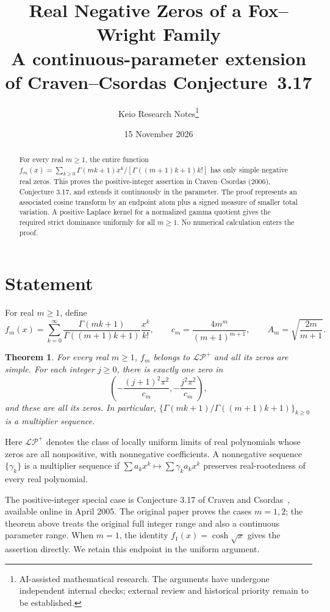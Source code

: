 \documentclass[11pt,a4paper]{article}
\title{\textbf{Real Negative Zeros of a Fox--Wright Family}\\[5pt]\large A continuous-parameter extension of Craven--Csordas Conjecture~3.17}
\author{Keio Research Notes\thanks{AI-assisted mathematical research. The arguments have undergone independent internal checks; external review and historical priority remain to be established.}}
\date{15 November 2026}
\newtheorem{theorem}{Theorem}
\newcommand{\LP}{\mathcal{LP}^{+}}
\begin{document}
\maketitle
\begin{abstract}
For every real $m\ge1$, the entire function
$f_m(x)=\sum_{k\ge0}\Gamma(mk+1)x^k/[\Gamma((m+1)k+1)k!]$
has only simple negative real zeros. This proves the positive-integer assertion
in Craven--Csordas (2006), Conjecture 3.17, and extends it continuously in the
parameter. The proof represents an associated cosine transform by an endpoint
atom plus a signed measure of smaller total variation. A positive Laplace kernel
for a normalized gamma quotient gives the required strict dominance uniformly
for all $m\ge1$. No numerical calculation enters the proof.
\end{abstract}

\section{Statement}
For real $m\ge1$, define
\[
f_m(x)=\sum_{k=0}^{\infty}
\frac{\Gamma(mk+1)}{\Gamma((m+1)k+1)}\frac{x^k}{k!},\qquad
c_m=\frac{4m^m}{(m+1)^{m+1}},\qquad
A_m=\sqrt{\frac{2m}{m+1}}.
\]
\begin{theorem}\label{thm:main}
For every real $m\ge1$, $f_m$ belongs to $\LP$ and all its zeros are simple.
For each integer $j\ge0$, there is exactly one zero in
\[
\left(-\frac{(j+1)^2\pi^2}{c_m},
      -\frac{j^2\pi^2}{c_m}\right),
\]
and these are all its zeros. In particular,
$\{\Gamma(mk+1)/\Gamma((m+1)k+1)\}_{k\ge0}$ is a multiplier sequence.
\end{theorem}
Here $\LP$ denotes the class of locally uniform limits of real
polynomials whose zeros are all nonpositive, with nonnegative coefficients.
A nonnegative sequence $\{\gamma_k\}$ is a multiplier sequence if
$\sum a_kx^k\mapsto\sum\gamma_k a_kx^k$ preserves real-rootedness
of every real polynomial.

The positive-integer special case is Conjecture 3.17 of
Craven and Csordas~\cite{CC}, available online in April 2005.
The original paper proves the cases $m=1,2$; the theorem above treats
the original full integer range and also a continuous parameter range. When $m=1$, the identity
$f_1(x)=\cosh\sqrt{x}$ gives the assertion directly. We retain this endpoint
in the uniform argument.
\end{document}
